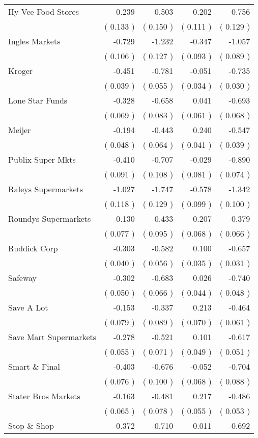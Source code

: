 \begin{table}[htbp]
\begin{tabular}{l*{ 4 }{D{.}{.}{-1}}}
Hy Vee Food Stores  &-0.239 &-0.503 & 0.202 &-0.756 \\ 
& (  0.133 )&(  0.150 )&(  0.111 )&(  0.129 )\\ 
Ingles Markets  &-0.729 &-1.232 &-0.347 &-1.057 \\ 
& (  0.106 )&(  0.127 )&(  0.093 )&(  0.089 )\\ 
Kroger  &-0.451 &-0.781 &-0.051 &-0.735 \\ 
& (  0.039 )&(  0.055 )&(  0.034 )&(  0.030 )\\ 
Lone Star Funds &-0.328 &-0.658 & 0.041 &-0.693 \\ 
& (  0.069 )&(  0.083 )&(  0.061 )&(  0.068 )\\ 
Meijer &-0.194 &-0.443 & 0.240 &-0.547 \\ 
& (  0.048 )&(  0.064 )&(  0.041 )&(  0.039 )\\ 
Publix Super Mkts  &-0.410 &-0.707 &-0.029 &-0.890 \\ 
& (  0.091 )&(  0.108 )&(  0.081 )&(  0.074 )\\ 
Raleys Supermarkets &-1.027 &-1.747 &-0.578 &-1.342 \\ 
& (  0.118 )&(  0.129 )&(  0.099 )&(  0.100 )\\ 
Roundys Supermarkets  &-0.130 &-0.433 & 0.207 &-0.379 \\ 
& (  0.077 )&(  0.095 )&(  0.068 )&(  0.066 )\\ 
Ruddick Corp &-0.303 &-0.582 & 0.100 &-0.657 \\ 
& (  0.040 )&(  0.056 )&(  0.035 )&(  0.031 )\\ 
Safeway  &-0.302 &-0.683 & 0.026 &-0.740 \\ 
& (  0.050 )&(  0.066 )&(  0.044 )&(  0.048 )\\ 
Save A Lot &-0.153 &-0.337 & 0.213 &-0.464 \\ 
& (  0.079 )&(  0.089 )&(  0.070 )&(  0.061 )\\ 
Save Mart Supermarkets &-0.278 &-0.521 & 0.101 &-0.617 \\ 
& (  0.055 )&(  0.071 )&(  0.049 )&(  0.051 )\\ 
Smart \& Final  &-0.403 &-0.676 &-0.052 &-0.704 \\ 
& (  0.076 )&(  0.100 )&(  0.068 )&(  0.088 )\\ 
Stater Bros Markets &-0.163 &-0.481 & 0.217 &-0.486 \\ 
& (  0.065 )&(  0.078 )&(  0.055 )&(  0.053 )\\ 
Stop \& Shop &-0.372 &-0.710 & 0.011 &-0.692 \\ 

\end{tabular}
\end{table}
